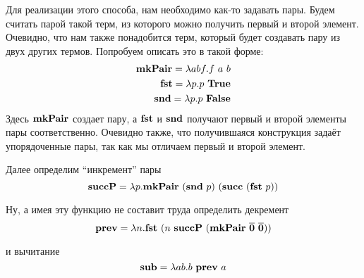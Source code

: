 \documentclass[lambda.tex]{subfiles}
\begin{document}
Для реализации этого способа, нам необходимо как-то задавать пары. Будем считать парой такой терм, из которого можно получить первый и второй элемент. Очевидно, что нам также понадобится терм, который будет создавать пару из двух других термов. Попробуем описать это в такой форме:
\begin{align*}
	\text{\textbf{mkPair}} = \lambda abf.f\ a\ b\\
	\text{\textbf{fst}} = \lambda p.p\ \text{\textbf{True}}\\
	\text{\textbf{snd}} = \lambda p.p\ \text{\textbf{False}}
\end{align*}
Здесь $\text{\textbf{mkPair}}$ создает пару, а $\text{\textbf{fst}}$ и $\text{\textbf{snd}}$ получают первый и второй элементы пары соответственно. Очевидно также, что получившаяся конструкция задаёт упорядоченные пары, так как мы отличаем первый и второй элемент.

Далее определим ``инкремент'' пары
\[\mmterm{succP} = \lambda p. \mmterm{mkPair}\ (\mmterm{snd}\ p)\ (\mmterm{succ}\ (\mmterm{fst}\ p))\]

Ну, а имея эту функцию не составит труда определить декремент
\[\mmterm{prev} = \lambda n.\mmterm{fst}\ (n\ \mmterm{succP}\ (\mmterm{mkPair}\ \mmchurchn{0}\ \mmchurchn{0}))\]

и вычитание
\[\mmterm{sub} = \lambda ab.b\ \mmterm{prev}\ a\]
\end{document}
